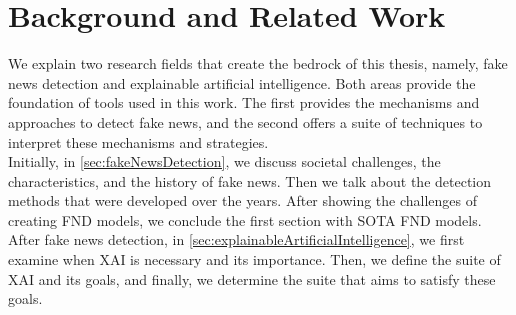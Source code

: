 
\chapter{Background and Related Work}\label{chapter:background}

We explain two research fields that create the bedrock of this thesis, namely, fake news detection and
explainable artificial intelligence. Both areas provide the foundation of tools used in this work. The first
provides the mechanisms and approaches to detect fake news, and the second offers a suite of techniques to interpret these mechanisms and strategies.\\
Initially, in \ref{sec:fakeNewsDetection}, we discuss societal challenges, the characteristics, and the history of fake news. Then we talk about the detection methods that were developed over the years. After showing the challenges of creating FND models, we conclude the first section with SOTA FND models.\\
After fake news detection, in \ref{sec:explainableArtificialIntelligence}, we first examine when XAI is necessary and its importance. Then, we define the suite of XAI and its goals, and finally, we determine the suite that aims to satisfy these goals.

